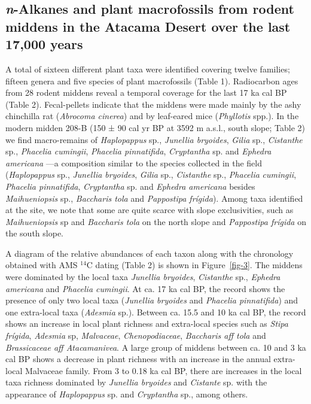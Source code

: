 \documentclass[
  authoryear,
  preprint,
  3p]{elsarticle}
\begin{document}
\hypertarget{n-alkanes-and-plant-macrofossils-from-rodent-middens-in-the-atacama-desert-over-the-last-17000-years}{%
\subsection{\texorpdfstring{\emph{n}-Alkanes and plant macrofossils from
rodent middens in the Atacama Desert over the last 17,000
years}{n-Alkanes and plant macrofossils from rodent middens in the Atacama Desert over the last 17,000 years}}\label{n-alkanes-and-plant-macrofossils-from-rodent-middens-in-the-atacama-desert-over-the-last-17000-years}}

A total of sixteen different plant taxa were identified covering twelve
families; fifteen genera and five species of plant macrofossils (Table
1). Radiocarbon ages from 28 rodent middens reveal a temporal coverage
for the last 17 ka cal BP (Table 2). Fecal-pellets indicate that the
middens were made mainly by the ashy chinchilla rat (\emph{Abrocoma
cinerea}) and by leaf-eared mice (\emph{Phyllotis} spp.). In the modern
midden 208-B (150 ± 90 cal yr BP at 3592 m a.s.l., south slope; Table 2)
we find macro-remains of \emph{Haplopappus} sp., \emph{Junellia
bryoides}, \emph{Gilia} sp., \emph{Cistanthe} sp., \emph{Phacelia
cumingii}, \emph{Phacelia pinnatifida}, \emph{Cryptantha} sp. and
\emph{Ephedra americana} ---a composition similar to the species
collected in the field (\emph{Haplopappus} sp., \emph{Junellia
bryoides}, \emph{Gilia} sp., \emph{Cistanthe} sp., \emph{Phacelia}
\emph{cumingii}, \emph{Phacelia pinnatifida}, \emph{Cryptantha} sp. and
\emph{Ephedra americana} besides \emph{Maihueniopsis} sp.,
\emph{Baccharis tola} and \emph{Pappostipa frígida}). Among taxa
identified at the site, we note that some are quite scarce with slope
exclusivities, such as \emph{Maihueniopsis} sp and \emph{Baccharis tola}
on the north slope and \emph{Pappostipa frígida} on the south slope.

A diagram of the relative abundances of each taxon along with the
chronology obtained with AMS \(^{14}\)C dating (Table 2) is shown in
Figure~\ref{fig-3}. The middens were dominated by the local taxa
\emph{Junellia bryoides}, \emph{Cistanthe} sp., \emph{Ephedra americana}
and \emph{Phacelia cumingii}. At ca. 17 ka cal BP, the record shows the
presence of only two local taxa (\emph{Junellia bryoides} and
\emph{Phacelia pinnatifida}) and one extra-local taxa (\emph{Adesmia}
sp.). Between ca. 15.5 and 10 ka cal BP, the record shows an increase in
local plant richness and extra-local species such as \emph{Stipa
frígida}, \emph{Adesmia} sp, \emph{Malvaceae}, \emph{Chenopodiaceae},
\emph{Baccharis aff tola} and \emph{Brassicaceae aff Atacamanivea}. A
large group of middens between ca. 10 and 3 ka cal BP shows a decrease
in plant richness with an increase in the annual extra-local Malvaceae
family. From 3 to 0.18 ka cal BP, there are increases in the local taxa
richness dominated by \emph{Junellia bryoides} and \emph{Cistante} sp.
with the appearance of \emph{Haplopappus} sp. and \emph{Cryptantha} sp.,
among others.
\end{document}
